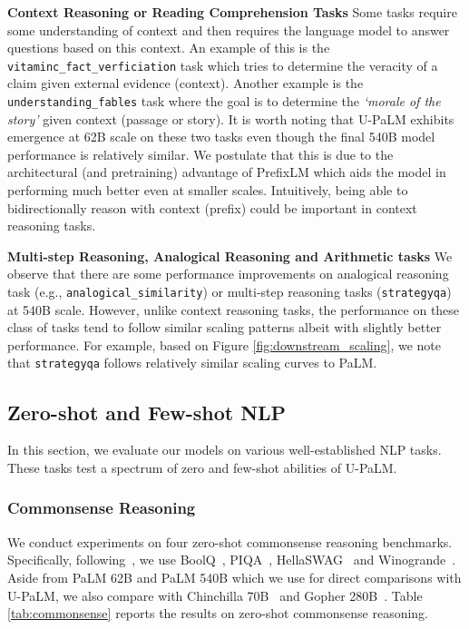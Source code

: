 \documentclass{article}
\newcommand{\modelname}{U-PaLM\xspace}
\begin{document}
\textbf{Context Reasoning or Reading Comprehension Tasks} Some tasks require some understanding of context and then requires the language model to answer questions based on this context. An example of this is the \texttt{vitaminc\_fact\_verficiation} task which tries to determine the veracity of a claim given external evidence (context). Another example is the \texttt{understanding\_fables} task where the goal is to determine the \textit{`morale of the story'} given context (passage or story). It is worth noting that \modelname exhibits emergence at 62B scale on these two tasks even though the final 540B model performance is relatively similar. We postulate that this is due to the architectural (and pretraining) advantage of PrefixLM which aids the model in performing much better even at smaller scales. Intuitively, being able to bidirectionally reason with context (prefix) could be important in context reasoning tasks.

\textbf{Multi-step Reasoning, Analogical Reasoning and Arithmetic tasks} We observe that there are some performance improvements on analogical reasoning task (e.g., \texttt{analogical\_similarity}) or multi-step reasoning tasks (\texttt{strategyqa}) at 540B scale. However, unlike context reasoning tasks, the performance on these class of tasks tend to follow similar scaling patterns albeit with slightly better performance. For example, based on Figure \ref{fig:downstream_scaling}, we note that \texttt{strategyqa} follows relatively similar scaling curves to PaLM.

\subsection{Zero-shot and Few-shot NLP}
In this section, we evaluate our models on various well-established NLP tasks. These tasks test a spectrum of zero and few-shot abilities of \modelname.
\subsubsection{Commonsense Reasoning}
We conduct experiments on four zero-shot commonsense reasoning benchmarks. Specifically, following~\citep{hoffmann2022training}, we use BoolQ~\citep{clark2019boolq}, PIQA~\citep{bisk2020piqa}, HellaSWAG~\citep{zellers2019hellaswag} and Winogrande~\citep{sakaguchi2019winogrande}. Aside from PaLM 62B and PaLM 540B which we use for direct comparisons with \modelname, we also compare with Chinchilla 70B~\citep{hoffmann2022training} and Gopher 280B~\citep{rae2021scaling}.  Table \ref{tab:commonsense} reports the results on zero-shot commonsense reasoning.
\end{document}
